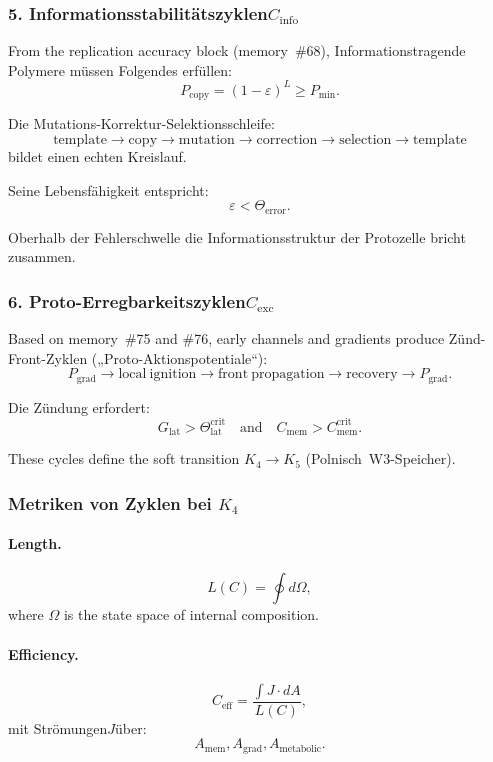 \subsubsection{5. Informationsstabilitätszyklen$C_{\mathrm{info}}$}

From the replication accuracy block (memory~\#68),
Informationstragende Polymere müssen Folgendes erfüllen:
\[
  P_{\mathrm{copy}}=(1-\varepsilon)^L \ge P_{\min}.
\]

Die Mutations-Korrektur-Selektionsschleife:
\[
  \mathrm{template}
  \to \mathrm{copy}
  \to \mathrm{mutation}
  \to \mathrm{correction}
  \to \mathrm{selection}
  \to \mathrm{template}
\]
bildet einen echten Kreislauf.

Seine Lebensfähigkeit entspricht:
\[
  \varepsilon < \Theta_{\mathrm{error}}.
\]

Oberhalb der Fehlerschwelle die Informationsstruktur der Protozelle
bricht zusammen.

\subsubsection{6. Proto-Erregbarkeitszyklen$C_{\mathrm{exc}}$}

Based on memory~\#75 and \#76, early channels and gradients produce
Zünd-Front-Zyklen („Proto-Aktionspotentiale“):
\[
  P_{\mathrm{grad}} \to
  \mathrm{local\ ignition} \to
  \mathrm{front\ propagation} \to
  \mathrm{recovery} \to
  P_{\mathrm{grad}}.
\]

Die Zündung erfordert:
\[
  G_{\mathrm{lat}} > \Theta^{\mathrm{crit}}_{\mathrm{lat}}
\quad\text{and}\quad
  C_{\mathrm{mem}}>C_{\mathrm{mem}}^{\mathrm{crit}}.
\]

These cycles define the soft transition $K_4\to K_5$ 
(Polnisch~W3-Speicher).

\subsubsection{Metriken von Zyklen bei \texorpdfstring{$K_4$}{K_4}}

\paragraph{Length.}
\[
  L(C)=\oint d\Omega,
\]
where $\Omega$ is the state space of internal composition.

\paragraph{Efficiency.}
\[
  C_{\mathrm{eff}}
    =\frac{\int J\cdot dA}{L(C)},
\]
mit Strömungen$J$über:
\[
  A_{\mathrm{mem}}, A_{\mathrm{grad}}, A_{\mathrm{metabolic}}.
\]

